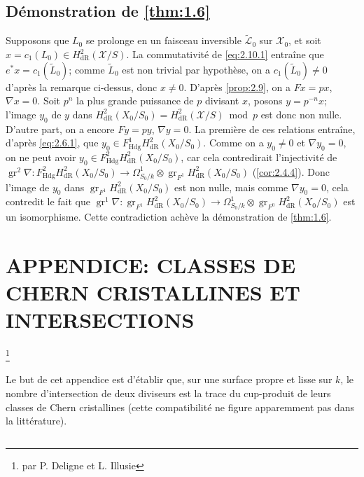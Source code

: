 \documentclass[12pt,a4paper]{article}
\theoremstyle{plain}
\theoremstyle{definition}
\theoremstyle{remark}
\DeclareMathOperator{\gr}{gr}
\newcommand{\Hdg}{\mathrm{Hdg}}
\begin{document}
\subsection{Démonstration de \ref{thm:1.6}}\label{subsec:2.11}

Supposons que $L_0$ se prolonge en un faisceau inversible $\tilde{\mathcal{L}}_0$ sur $\mathcal{X}_0$, et soit $x = c_1(L_0) \in H^2_{\mathrm{dR}}(\mathcal{X}/S)$. La commutativité de \eqref{eq:2.10.1} entraîne que $e^*x = c_1(\tilde{L}_0)$; comme $\tilde{L}_0$ est non trivial par hypothèse, on a $c_1(\tilde{L}_0) \neq 0$ d'après la remarque ci-dessus, donc $x \neq 0$. D'après \ref{prop:2.9}, on a $Fx = px$, $\nabla x = 0$. Soit $p^n$ la plus grande puissance de $p$ divisant $x$, posons $y = p^{-n}x$; l'image $y_0$ de $y$ dans $H^2_{\mathrm{dR}}(X_0/S_0) = H^2_{\mathrm{dR}}(\mathcal{X}/S) \bmod p$ est donc non nulle. D'autre part, on a encore $Fy = py$, $\nabla y = 0$. La première de ces relations entraîne, d'après \eqref{eq:2.6.1}, que $y_0 \in F^1_{\Hdg} H^2_{\mathrm{dR}}(X_0/S_0)$. Comme on a $y_0 \neq 0$ et $\nabla y_0 = 0$, on ne peut avoir $y_0 \in F^2_{\Hdg} H^2_{\mathrm{dR}}(X_0/S_0)$, car cela contredirait l'injectivité de $\gr^2 \nabla: F^2_{\Hdg} H^2_{\mathrm{dR}}(X_0/S_0) \to \Omega^1_{S_0/k} \otimes \gr_{F^1} H^2_{\mathrm{dR}}(X_0/S_0)$ (\ref{cor:2.4.4}). Donc l'image de $y_0$ dans $\gr_{F^1} H^2_{\mathrm{dR}}(X_0/S_0)$ est non nulle, mais comme $\nabla y_0 = 0$, cela contredit le fait que $\gr^1 \nabla: \gr_{F^1} H^2_{\mathrm{dR}}(X_0/S_0) \to \Omega^1_{S_0/k} \otimes \gr_{F^0} H^2_{\mathrm{dR}}(X_0/S_0)$ est un isomorphisme. Cette contradiction achève la démonstration de \ref{thm:1.6}.


\section{APPENDICE: CLASSES DE CHERN CRISTALLINES ET INTERSECTIONS}\label{sec:3}
\footnote{par P. Deligne et L. Illusie}

Le but de cet appendice est d'établir que, sur une surface propre et lisse sur $k$, le nombre d'intersection de deux diviseurs est la trace du cup-produit de leurs classes de Chern cristallines (cette compatibilité ne figure apparemment pas dans la littérature).

\subsection{}
\end{document}
